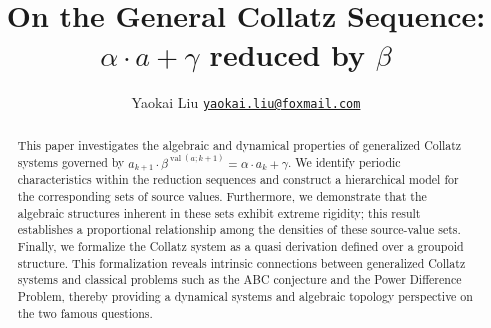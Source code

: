 \documentclass[a4paper,12pt]{article}
\title{On the General Collatz Sequence: $\alpha \cdot a + \gamma$ reduced by $\beta$}
\author{Yaokai Liu
\href{mailto:yaokai.liu@foxmail.com}{{\texttt{yaokai.liu@foxmail.com}}}}
\theoremstyle{sltheorem}
\DeclareMathOperator{\val}{val}
\begin{document}
\maketitle
\begin{abstract}
This paper investigates the algebraic and dynamical properties of generalized Collatz systems governed by $a_{k+1}\cdot\beta^{\val(a;k+1)} = \alpha\cdot a_{k} + \gamma$.
We identify periodic characteristics within the reduction sequences and construct a hierarchical model for the corresponding sets of source values.
Furthermore, we demonstrate that the algebraic structures inherent in these sets exhibit extreme rigidity; this result establishes a proportional relationship among the densities of these source-value sets.
Finally, we formalize the Collatz system as a quasi derivation defined over a groupoid structure.
This formalization reveals intrinsic connections between generalized Collatz systems and classical problems such as the ABC conjecture and the Power Difference Problem, thereby providing a dynamical systems and algebraic topology perspective on the two famous questions.
\end{abstract}
\tableofcontents

\printnomenclature[10em]










\appendix
% 



\newpage


\nocite{*}
\end{document}
